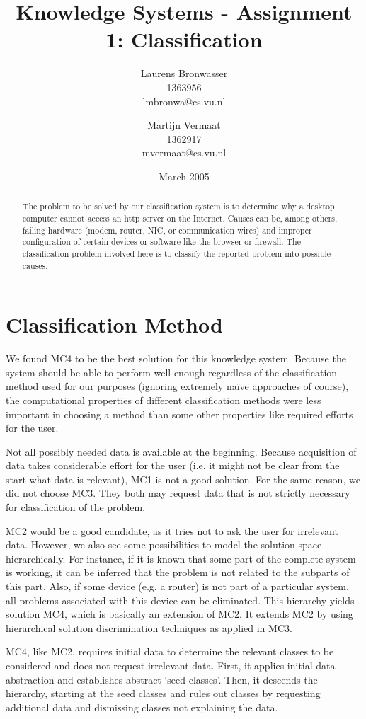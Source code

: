 \documentclass[a4paper,11pt]{article}
\title{Knowledge Systems - Assignment 1: Classification}
\author{Laurens Bronwasser\\
1363956\\
lmbronwa@cs.vu.nl
\and
Martijn Vermaat\\
1362917\\
mvermaat@cs.vu.nl}
\date{March 2005}
\begin{document}
\maketitle


\renewcommand{\abstractname}{Introduction}
\begin{abstract}
  The problem to be solved by our classification system is to determine why a
  desktop computer cannot access an http server on the Internet. Causes can
  be, among others, failing hardware (modem, router, NIC, or communication
  wires) and improper configuration of certain devices or software like the
  browser or firewall. The classification problem involved here is to
  classify the reported problem into possible causes.
\end{abstract}


\section*{Classification Method}

We found MC4 to be the best solution for this knowledge system. Because the
system should be able to perform well enough regardless of the classification
method used for our purposes (ignoring extremely na\"ive approaches of
course), the computational properties of different classification methods were
less important in choosing a method than some other properties like required
efforts for the user.

Not all possibly needed data is available at the beginning. Because
acquisition of data takes considerable effort for the user (i.e. it might not
be clear from the start what data is relevant), MC1 is not a good
solution. For the same reason, we did not choose MC3. They both may request 
data that is not strictly necessary for classification of the problem.

MC2 would be a good candidate, as it tries not to ask the user for irrelevant
data. However, we also see some possibilities to model the solution space
hierarchically. For instance, if it is known that some part of the complete
system is working, it can be inferred that the problem is not related to the
subparts of this part. Also, if some device (e.g. a router) is not part of a
particular system, all problems associated with this device can be
eliminated. This hierarchy yields solution MC4, which is basically an
extension of MC2. It extends MC2 by using hierarchical solution discrimination
techniques as applied in MC3.

MC4, like MC2, requires initial data to determine the relevant classes to be
considered and does not request irrelevant data. First, it applies initial data
abstraction and establishes abstract `seed classes'. Then, it descends the
hierarchy, starting at the seed classes and rules out classes by requesting
additional data and dismissing classes not explaining the data.
\end{document}
